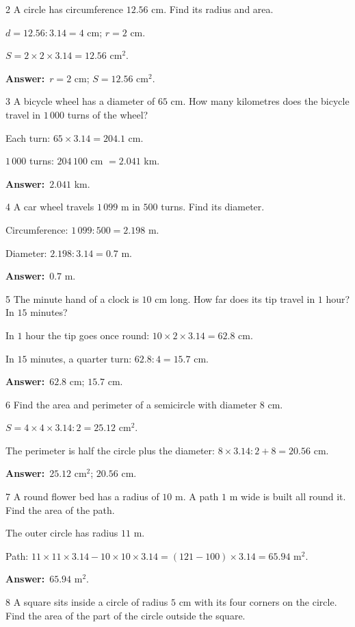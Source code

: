 \documentclass[11pt]{article}
\newif\ifsol \solfalse
\providecommand{\AnsWord}{Đáp số}
\newcommand{\dapso}[1]{\par\textbf{\AnsWord:}\ #1}
\newcommand{\probsol}[1]{%
  \begin{lrbox}{\solmeasure}\begin{minipage}{\dimexpr\linewidth-24pt\relax}#1\end{minipage}\end{lrbox}%
  \ifsol
    \begin{solbox}#1\end{solbox}%
  \else
    \setlength{\solht}{\dimexpr\ht\solmeasure+\dp\solmeasure+0.85cm\relax}%
    \ifdim\solht<1.35cm\setlength{\solht}{1.35cm}\fi
    \begin{tcolorbox}[colback=white,colframe=Line,boxrule=0.8pt,arc=5pt,
      left=8pt,right=8pt,top=4pt,bottom=4pt,height=\solht]{\footnotesize\color{Slate}\itshape\WorkWord}\end{tcolorbox}%
  \fi}
\newcommand{\gap}{\vspace{0.3cm}}
\def\WorkWord{Your work:}
\def\AnsWord{Answer}
\begin{document}
\gap
\begin{probbox}{2}{\relax}
A circle has circumference $12.56$ cm. Find its radius and area.
\end{probbox}
\probsol{
$d=12.56:3.14=4$ cm; $r=2$ cm.\par $S=2\times2\times3.14=12.56$ cm$^2$.
\dapso{$r=2$ cm; $S=12.56$ cm$^2$.}}
\gap
\begin{probbox}{3}{\relax}
A bicycle wheel has a diameter of $65$ cm. How many kilometres does the bicycle travel in $1\,000$ turns of the wheel?
\end{probbox}
\probsol{
Each turn: $65\times3.14=204.1$ cm.\par $1\,000$ turns: $204\,100$ cm $=2.041$ km.
\dapso{$2.041$ km.}}
\gap
\begin{probbox}{4}{\relax}
A car wheel travels $1\,099$ m in $500$ turns. Find its diameter.
\end{probbox}
\probsol{
Circumference: $1\,099:500=2.198$ m.\par Diameter: $2.198:3.14=0.7$ m.
\dapso{$0.7$ m.}}
\gap
\begin{probbox}{5}{\relax}
The minute hand of a clock is $10$ cm long. How far does its tip travel in $1$ hour? In $15$ minutes?
\end{probbox}
\probsol{
In $1$ hour the tip goes once round: $10\times2\times3.14=62.8$ cm.\par In $15$ minutes, a quarter turn: $62.8:4=15.7$ cm.
\dapso{$62.8$ cm; $15.7$ cm.}}
\gap
\begin{probbox}{6}{\relax}
Find the area and perimeter of a semicircle with diameter $8$ cm.
\end{probbox}
\probsol{
$S=4\times4\times3.14:2=25.12$ cm$^2$.\par The perimeter is half the circle plus the diameter: $8\times3.14:2+8=20.56$ cm.
\dapso{$25.12$ cm$^2$; $20.56$ cm.}}
\gap
\begin{probbox}{7}{\relax}
A round flower bed has a radius of $10$ m. A path $1$ m wide is built all round it. Find the area of the path.
\end{probbox}
\probsol{
The outer circle has radius $11$ m.\par Path: $11\times11\times3.14-10\times10\times3.14=(121-100)\times3.14=65.94$ m$^2$.
\dapso{$65.94$ m$^2$.}}
\gap
\begin{probbox}{8}{\relax}
A square sits inside a circle of radius $5$ cm with its four corners on the circle. Find the area of the part of the circle outside the square.
\end{probbox}
\end{document}
